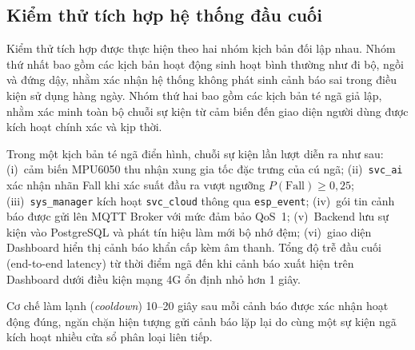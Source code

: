 \documentclass[../DoAn.tex]{subfiles}
\begin{document}
\subsection{Kiểm thử tích hợp hệ thống đầu cuối}

Kiểm thử tích hợp được thực hiện theo hai nhóm kịch bản đối lập nhau. Nhóm thứ nhất bao gồm các kịch bản hoạt động sinh hoạt bình thường như đi bộ, ngồi và đứng dậy, nhằm xác nhận hệ thống không phát sinh cảnh báo sai trong điều kiện sử dụng hàng ngày. Nhóm thứ hai bao gồm các kịch bản té ngã giả lập, nhằm xác minh toàn bộ chuỗi sự kiện từ cảm biến đến giao diện người dùng được kích hoạt chính xác và kịp thời.

Trong một kịch bản té ngã điển hình, chuỗi sự kiện lần lượt diễn ra như sau: (i)~cảm biến MPU6050 thu nhận xung gia tốc đặc trưng của cú ngã; (ii)~\texttt{svc\_ai} xác nhận nhãn Fall khi xác suất đầu ra vượt ngưỡng $P(\text{Fall}) \geq 0{,}25$; (iii)~\texttt{sys\_manager} kích hoạt \texttt{svc\_cloud} thông qua \texttt{esp\_event}; (iv)~gói tin cảnh báo được gửi lên MQTT Broker với mức đảm bảo QoS~1; (v)~Backend lưu sự kiện vào PostgreSQL và phát tín hiệu làm mới bộ nhớ đệm; (vi)~giao diện Dashboard hiển thị cảnh báo khẩn cấp kèm âm thanh. Tổng độ trễ đầu cuối (end-to-end latency) từ thời điểm ngã đến khi cảnh báo xuất hiện trên Dashboard dưới điều kiện mạng 4G ổn định nhỏ hơn 1 giây.

Cơ chế làm lạnh (\textit{cooldown}) 10--20 giây sau mỗi cảnh báo được xác nhận hoạt động đúng, ngăn chặn hiện tượng gửi cảnh báo lặp lại do cùng một sự kiện ngã kích hoạt nhiều cửa sổ phân loại liên tiếp.
\end{document}
